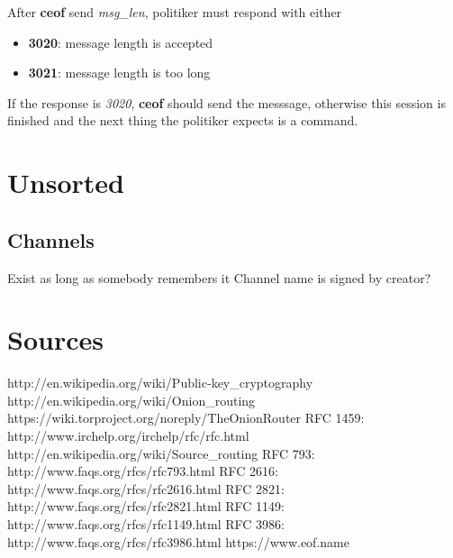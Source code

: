 \documentclass[12pt,a4paper]{book}
\begin{document}
After \textbf{ceof} send \textit{msg\_len}, politiker must respond with
either
\begin{itemize}
\item \textbf{3020}: message length is accepted
\item \textbf{3021}: message length is too long
\end{itemize}

If the response is \textit{3020}, \textbf{ceof} should send the messsage,
otherwise this session is finished and the next thing the politiker expects
is a command.

\chapter{Unsorted}
\section{Channels}
Exist as long as somebody remembers it
Channel name is signed by creator?
\appendix
\chapter{Sources}
\begin{thebibliography}{42}
 http://en.wikipedia.org/wiki/Public-key\_cryptography
 http://en.wikipedia.org/wiki/Onion\_routing
 https://wiki.torproject.org/noreply/TheOnionRouter
 RFC 1459: http://www.irchelp.org/irchelp/rfc/rfc.html
 http://en.wikipedia.org/wiki/Source\_routing
 RFC 793: http://www.faqs.org/rfcs/rfc793.html
 RFC 2616: http://www.faqs.org/rfcs/rfc2616.html
 RFC 2821: http://www.faqs.org/rfcs/rfc2821.html
 RFC 1149: http://www.faqs.org/rfcs/rfc1149.html
 RFC 3986: http://www.faqs.org/rfcs/rfc3986.html
 https://www.eof.name
\end{thebibliography}

\printindex
\end{document}
